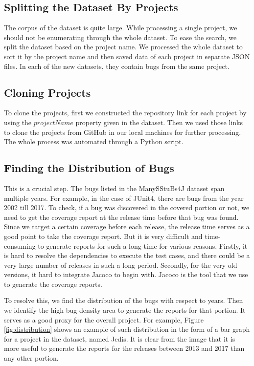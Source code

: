 \documentclass[sigconf,nonacm]{acmart}
\begin{document}
\subsection{Splitting the Dataset By Projects}

The corpus of the dataset is quite large. While processing a single project, we should not be enumerating through the whole dataset. To ease the search, we split the dataset based on the project name. We processed the whole dataset to sort it by the project name and then saved data of each project in separate JSON files. In each of the new datasets, they contain bugs from the same project.

\subsection{Cloning Projects}

To clone the projects, first we constructed the repository link for each project by using the $projectName$ property given in the dataset. Then we used those links to clone the projects from GitHub in our local machines for further processing. The whole process was automated through a Python script.

\subsection{Finding the Distribution of Bugs}

This is a crucial step. The bugs listed in the ManySStuBs4J\cite{sstubs} dataset span multiple years. For example, in the case of JUnit4, there are bugs from the year 2002 till 2017. To check, if a bug was discovered in the covered portion or not, we need to get the coverage report at the release time before that bug was found. Since we target a certain coverage before each release, the release time serves as a good point to take the coverage report. But it is very difficult and time-consuming to generate reports for such a long time for various reasons. Firstly, it is hard to resolve the dependencies to execute the test cases, and there could be a very large number of releases in such a long period. Secondly, for the very old versions, it hard to integrate Jacoco to begin with. Jacoco is the tool that we use to generate the coverage reports.

To resolve this, we find the distribution of the bugs with respect to years. Then we identify the high bug density area to generate the reports for that portion. It serves as a good proxy for the overall project. For example, Figure \ref{fig:distribution} shows an example of such distribution in the form of a bar graph for a project in the dataset, named Jedis. It is clear from the image that it is more useful to generate the reports for the releases between 2013 and 2017 than any other portion.
\end{document}
